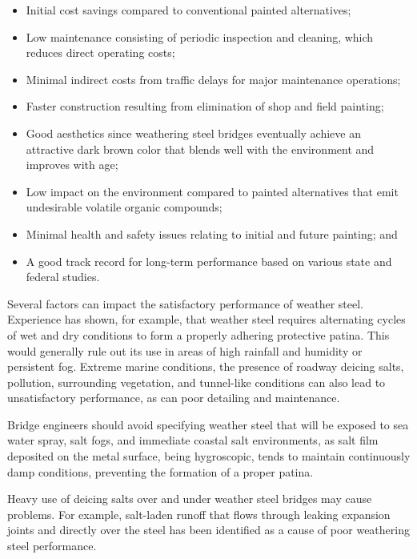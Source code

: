 \begin{itemize}
  \item Initial cost savings compared to conventional painted alternatives;
  \item Low maintenance consisting of periodic inspection and cleaning, which reduces direct operating costs;
  \item Minimal indirect costs from traffic delays for major maintenance operations;
  \item Faster construction resulting from elimination of shop and field painting;
  \item Good aesthetics since weathering steel bridges eventually achieve an attractive dark brown color that blends well with the environment and improves with age;
  \item Low impact on the environment compared to painted alternatives that emit undesirable volatile organic compounds;
  \item Minimal health and safety issues relating to initial and future painting; and
  \item A good track record for long-term performance based on various state and federal studies.
\end{itemize}

Several factors can impact the satisfactory performance of weather steel. Experience has shown, for example,
that weather steel requires alternating cycles of wet and dry conditions to form a properly adhering protective patina.
This would generally rule out its use in areas of high rainfall and humidity or persistent fog. Extreme marine
conditions, the presence of roadway deicing salts, pollution, surrounding vegetation, and tunnel-like conditions can
also lead to unsatisfactory performance, as can poor detailing and maintenance.

Bridge engineers should avoid specifying weather steel that will be exposed to sea water spray, salt fogs, and
immediate coastal salt environments, as salt film deposited on the metal surface, being hygroscopic, tends to maintain
continuously damp conditions, preventing the formation of a proper patina.

Heavy use of deicing salts over and under weather steel bridges may cause problems. For example, salt-laden
runoff that flows through leaking expansion joints and directly over the steel has been identified as a cause of poor
weathering steel performance.

